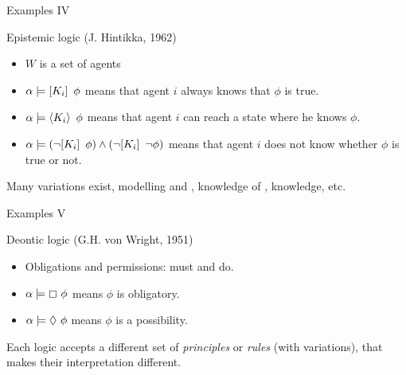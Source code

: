 \documentclass[aspectratio=169]{beamer}
\begin{document}
\begin{slide}{Examples IV}\label{s:19}
\small
\begin{block}{Epistemic logic (J. Hintikka, 1962)}
\begin{itemize}
\item $W$ is a set of agents 
\item $\alpha \models [K_i]\, ~\phi$ means that agent $i$ always knows that $\phi$ is true.
\item $\alpha \models \langle K_i \rangle\, ~\phi$ means that agent $i$ can reach a state where he knows $\phi$.
\item $\alpha \models (\lnot [K_i]\, ~\phi) \land (\lnot [K_i]\, ~\lnot \phi)$ means that agent $i$ does not know whether $\phi$ is true or not.
\end{itemize}
\end{block}

Many variations exist, modelling  and , knowledge of ,  knowledge, etc.

\end{slide}


\begin{slide}{Examples V}\label{s:20}
\small
\begin{block}{Deontic logic (G.H. von Wright, 1951)}
\begin{itemize}
\item Obligations and permissions: \alert{must} and  do.
\item $\alpha \models \boxempty~\phi$ means $\phi$ is obligatory.
\item $\alpha \models \Diamond~\phi$ means $\phi$ is a possibility.
\end{itemize}
\end{block}

Each logic accepts a different set of \emph{principles} or \emph{rules} (with variations), that makes their interpretation different.

\end{slide}
\end{document}
